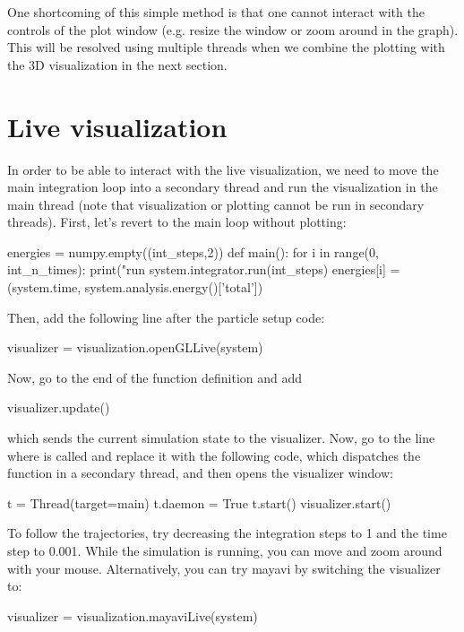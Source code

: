 \documentclass[
paper=a4,                       %
fontsize=11pt,                  %
twoside,                        %
footsepline,                    %
headsepline,                    %
headinclude=false,              %
footinclude=false,              %
pagesize,                       %
]{scrartcl}
\begin{document}
\noindent One shortcoming of this simple method is that one cannot interact with the controls of the plot window (e.g. resize the window or zoom around in the graph).
This will be resolved using multiple threads when we combine the plotting with the 3D visualization in the next section.

\section{Live visualization}
\label{vis}

In order to be able to interact with the live visualization, we need to move the main integration loop into a secondary thread and run the visualization in the main thread (note that visualization or plotting cannot be run in secondary threads). First, let's revert to the main loop without plotting:
\begin{pypresso}
energies = numpy.empty((int_steps,2))
def main():
    for i in range(0, int_n_times):
        print("run %
        system.integrator.run(int_steps)
        energies[i] = (system.time, system.analysis.energy()['total'])
\end{pypresso}

Then, add the following line after the particle setup code:
\begin{pypresso}
visualizer = visualization.openGLLive(system)
\end{pypresso}
Now, go to the end of the  function definition and add
\begin{pypresso}
visualizer.update()
\end{pypresso}
which sends the current simulation state to the visualizer.
Now, go to the line where  is called and replace it with the following code, which dispatches the function in a secondary thread, and then opens the visualizer window:
\begin{pypresso}
t = Thread(target=main)
t.daemon = True
t.start()
visualizer.start()
\end{pypresso}

To follow the trajectories, try decreasing the integration steps to 1 and the
time step to 0.001.  While the simulation is running, you can move and zoom
around with your mouse. Alternatively, you can try mayavi by
switching the visualizer to:

\begin{pypresso}
visualizer = visualization.mayaviLive(system)
\end{pypresso}
\end{document}
